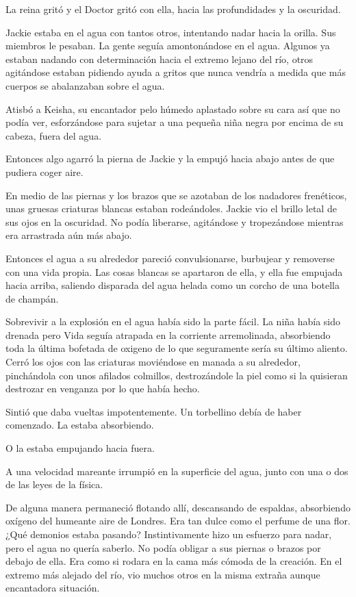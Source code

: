 {La reina gritó y el Doctor gritó con ella, hacia las profundidades y la
oscuridad.}

{Jackie estaba en el agua con tantos otros, intentando nadar hacia la
 orilla. Sus miembros le pesaban. La gente seguía amontonándose en el
 agua. Algunos ya estaban nadando con determinación hacia el extremo
 lejano del río, otros agitándose estaban pidiendo ayuda a gritos que
nunca vendría a medida que más cuerpos se abalanzaban sobre el agua.}

{Atisbó a Keisha, su encantador pelo húmedo aplastado sobre su cara así
 que no podía ver, esforzándose para sujetar a una pequeña niña negra por
encima de su cabeza, fuera del agua.}

{Entonces algo agarró la pierna de Jackie y la empujó hacia abajo antes
de que pudiera coger aire.}

{En medio de las piernas y los brazos que se azotaban de los nadadores
 frenéticos, unas gruesas criaturas blancas estaban rodeándoles. Jackie
 vio el brillo letal de sus ojos en la oscuridad. No podía liberarse,
agitándose y tropezándose mientras era arrastrada aún más abajo.}

{Entonces el agua a su alrededor pareció convulsionarse, burbujear y
 removerse con una vida propia. Las cosas blancas se apartaron de ella, y
 ella fue empujada hacia arriba, saliendo disparada del agua helada como
un corcho de una botella de champán.}

\mbox{}

{Sobrevivir a la explosión en el agua había sido la parte fácil. La niña
 había sido drenada pero Vida seguía atrapada en la corriente
 arremolinada, absorbiendo toda la última bofetada de oxigeno de lo que
 seguramente sería su último aliento. Cerró los ojos con las criaturas
 moviéndose en manada a su alrededor, pinchándola con unos afilados
 colmillos, destrozándole la piel como si la quisieran destrozar en
venganza por lo que había hecho.}

{Sintió que daba vueltas impotentemente. Un torbellino debía de haber
comenzado. La estaba absorbiendo.}

{O la estaba empujando hacia fuera.}

{A una velocidad mareante irrumpió en la superficie del agua, junto con
una o dos de las leyes de la física.}

{De alguna manera permaneció flotando allí, descansando de espaldas,
 absorbiendo oxígeno del humeante aire de Londres. Era tan dulce como el
 perfume de una flor. ¿Qué demonios estaba pasando? Instintivamente hizo
 un esfuerzo para nadar, pero el agua no quería saberlo. No podía obligar
 a sus piernas o brazos por debajo de ella. Era como si rodara en la cama
 más cómoda de la creación. En el extremo más alejado del río, vio muchos
otros en la misma extraña aunque encantadora situación.}

